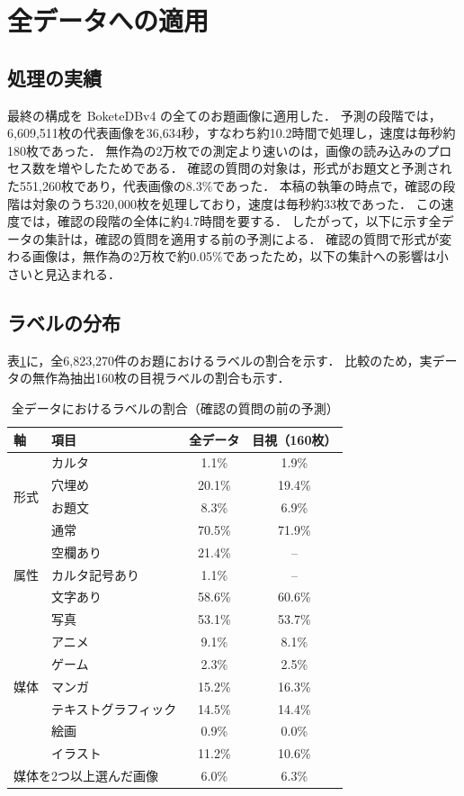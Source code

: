 \section{全データへの適用}
\label{sec_full}
\subsection{処理の実績}
最終の構成を BoketeDBv4 の全てのお題画像に適用した．
予測の段階では，6,609,511枚の代表画像を36,634秒，すなわち約10.2時間で処理し，速度は毎秒約180枚であった．
無作為の2万枚での測定より速いのは，画像の読み込みのプロセス数を増やしたためである．
確認の質問の対象は，形式がお題文と予測された551,260枚であり，代表画像の8.3\%であった．
本稿の執筆の時点で，確認の段階は対象のうち320,000枚を処理しており，速度は毎秒約33枚であった．
この速度では，確認の段階の全体に約4.7時間を要する．
したがって，以下に示す全データの集計は，確認の質問を適用する前の予測による．
確認の質問で形式が変わる画像は，無作為の2万枚で約0.05\%であったため，以下の集計への影響は小さいと見込まれる．

\subsection{ラベルの分布}
表\ref{tab_full_dist}に，全6,823,270件のお題におけるラベルの割合を示す．
比較のため，実データの無作為抽出160枚の目視ラベルの割合も示す．

\begin{table}[t]
    \centering
    \caption{全データにおけるラベルの割合（確認の質問の前の予測）}
    \label{tab_full_dist}
    \small
    \begin{tabular}{llcc}
        \toprule
        軸 & 項目 & 全データ & 目視（160枚） \\
        \midrule
        \multirow{4}{*}{形式} & カルタ & 1.1\% & 1.9\% \\
         & 穴埋め & 20.1\% & 19.4\% \\
         & お題文 & 8.3\% & 6.9\% \\
         & 通常 & 70.5\% & 71.9\% \\
        \midrule
        \multirow{3}{*}{属性} & 空欄あり & 21.4\% & -- \\
         & カルタ記号あり & 1.1\% & -- \\
         & 文字あり & 58.6\% & 60.6\% \\
        \midrule
        \multirow{7}{*}{媒体} & 写真 & 53.1\% & 53.7\% \\
         & アニメ & 9.1\% & 8.1\% \\
         & ゲーム & 2.3\% & 2.5\% \\
         & マンガ & 15.2\% & 16.3\% \\
         & テキストグラフィック & 14.5\% & 14.4\% \\
         & 絵画 & 0.9\% & 0.0\% \\
         & イラスト & 11.2\% & 10.6\% \\
        \midrule
        \multicolumn{2}{l}{媒体を2つ以上選んだ画像} & 6.0\% & 6.3\% \\
        \bottomrule
    \end{tabular}
\end{table}

